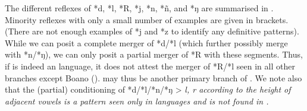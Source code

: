 
The different reflexes of  *d,
*l, *R, *j, *n, *ñ,
and *ŋ are summarised in .
Minority reflexes with only a small number of examples are given in brackets.
(There are not enough examples of *j
and *z to identify any definitive patterns).
While we can posit a complete merger of *d/*l (which further
possibly merge with *n/*ŋ),
we can only posit a partial merger of *R with these segments.
Thus, if  is indeed an  language,
it does not attest the merger of *R/*l seen in all other branches except Boano ().
 may thus be another primary branch of .
We note also that the (partial) conditioning of *d/*l/*n/*ŋ >
\it{l, r} according to the height of adjacent vowels is a pattern seen
only in  languages
and is not found in .

